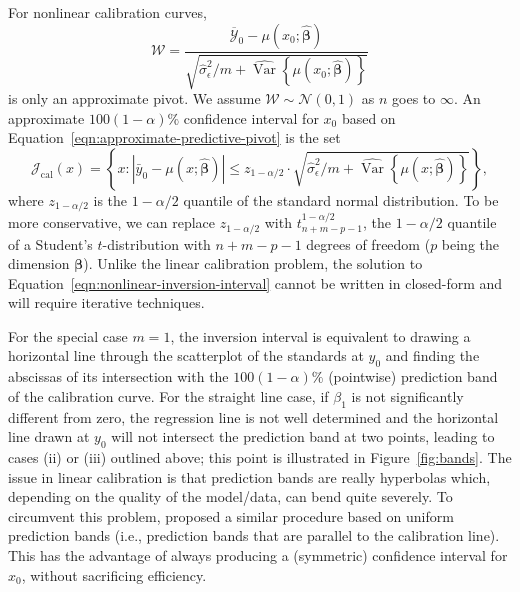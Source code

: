 \documentclass[cmfont,usenames,dvipsnames,leqno]{afit-etd}\usepackage[]{graphicx}\usepackage[]{color}
\newcommand{\mc}[1]{\ensuremath{\mathcal{#1}}}
\newcommand{\wh}[1]{\ensuremath{\widehat{#1}}}
\newcommand{\wb}[1]{\ensuremath{\overline{#1}}}
\newcommand{\var}{\operatorname{Var}}
\begin{document}
For nonlinear calibration curves, 
\begin{equation}
\label{eqn:approximate-predictive-pivot}
  \mc{W} = \frac{\wb{\mc{Y}}_0 - \mu\left(x_0; \wh{\bm{\beta}}\right)}{\sqrt{\wh{\sigma}_\epsilon^2/m + \wh{\var}\left\{\mu\left(x_0; \wh{\bm{\beta}}\right)\right\}}}
\end{equation}
is only an approximate pivot. We assume $\mc{W} \sim \mc{N}(0, 1)$ as $n$ goes to $\infty$. An approximate $100(1 - \alpha)\%$ confidence interval for $x_0$ based on Equation~\eqref{eqn:approximate-predictive-pivot} is the set 
\begin{equation}
\label{eqn:nonlinear-inversion-interval}
  \mc{J}_\mathrm{cal}(x) = \left\{x: \left|\bar{y}_0 - \mu\left(x; \wh{\bm{\beta}}\right)\right| \le z_{1-\alpha/2} \cdot \sqrt{\wh{\sigma}_\epsilon^2/m + \wh{\var}\left\{\mu\left(x; \wh{\bm{\beta}}\right)\right\}}\right\},
\end{equation}
where $z_{1-\alpha/2}$ is the $1 - \alpha/2$ quantile of the standard normal distribution. To be more conservative, we can replace $z_{1-\alpha/2}$ with $t_{n+m-p-1}^{1-\alpha/2}$, the $1-\alpha/2$ quantile of a Student's $t$-distribution with $n+m-p-1$ degrees of freedom ($p$ being the dimension $\bm{\beta}$). Unlike the linear calibration problem, the solution to Equation~\eqref{eqn:nonlinear-inversion-interval} cannot be written in closed-form and will require iterative techniques. 

For the special case $m = 1$, the inversion interval is equivalent to drawing a horizontal line through the scatterplot of the standards at $y_0$ and finding the abscissas of its intersection with the $100(1-\alpha)\%$ (pointwise) prediction band of the calibration curve. For the straight line case, if $\beta_1$ is not significantly different from zero, the regression line is not well determined and the horizontal line drawn at $y_0$ will not intersect the prediction band at two points, leading to cases (ii) or (iii) outlined above; this point is illustrated in Figure~\ref{fig:bands}. The issue in linear calibration is that prediction bands are really hyperbolas which, depending on the quality of the model/data, can bend quite severely. To circumvent this problem, \citet{trout_regular_1979} proposed a similar procedure based on uniform prediction bands (i.e., prediction bands that are parallel to the calibration line). This has the advantage of always producing a (symmetric) confidence interval for $x_0$, without sacrificing efficiency. 
\end{document}
